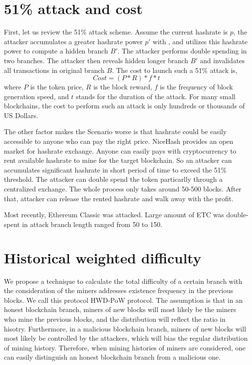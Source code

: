 \documentclass[conference]{IEEEtran}
\begin{document}
\section{51\% attack and cost}
First, let us review the 51\% attack scheme. Assume the current hashrate is $p$, the attacker accumulates a greater hashrate power $p'$ with , and utilizes this hashrate power to compute a hidden branch $B'$. The attacker performs double spending in two branches. The attacker then reveals hidden longer branch $B'$ and invalidates all transactions in original branch $B$. The cost to launch such a 51\% attack is,
\begin{equation}
Cost=(P*R)*f*t\label{eq_cost}
\end{equation}
where $P$ is the token price, $R$ is the block reward, $f$ is the frequency of block generation speed, and $t$ stands for the duration of the attack.
For many small blockchains, the cost to perform such an attack is only hundreds or thousands of US Dollars\cite{b9}.

The other factor makes the Scenario worse is that hashrate could be easily accessible to anyone who can pay the right price. NiceHash\cite{b10} provides an open market for hashrate exchange. Anyone can easily pays with cryptocurrency to rent available hashrate to mine for the target blockchain. So an attacker can accumulates significant hashrate in short period of time to exceed the 51\% threshold. The attacker can double spend the token particarlly through a centralized exchange. The whole process only takes around 50-500 blocks. After that, attacker can release the rented hashrate and walk away with the profit. 

Most recently, Ethereum Classic\cite{b11} was attacked. Large amount of ETC was double-spent in attack branch length ranged from 50 to 150.

\section{Historical weighted difficulty}

We propose a technique to calculate the total difficulty of a certain branch with the consideration of the miners addresses existence frequency in the previous blocks. We call this protocol HWD-PoW protocol. The assumption is that in an honest blockchain branch, miners of new blocks will most likely be the miners who mine the previous blocks, and the distribution will reflect the ratio in hisotry. Furthermore, in a malicious blockchain branch, miners of new blocks will most likely be controlled by the attackers, which will bias the regular distribution of mining history. Therefore, when mining histories of miners are considered, one can easily distinguish an honest blockchain branch from a malicious one.
\end{document}
